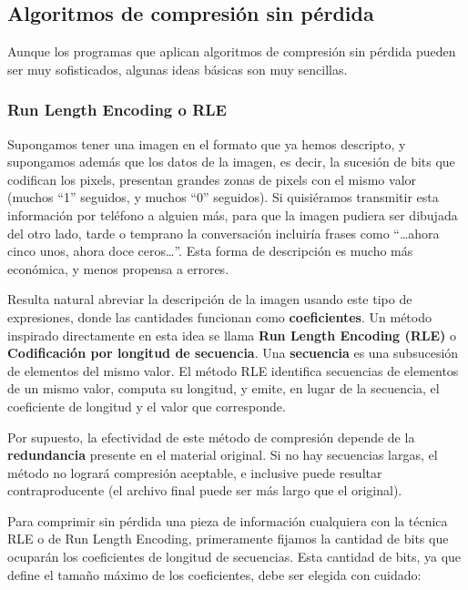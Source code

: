 \documentclass[spanish,A4,]{article}
\begin{document}
\subsection{Algoritmos de compresión sin
pérdida}\label{algoritmos-de-compresiuxf3n-sin-puxe9rdida}

Aunque los programas que aplican algoritmos de compresión sin pérdida
pueden ser muy sofisticados, algunas ideas básicas son muy sencillas.

\subsubsection{Run Length Encoding o
RLE}\label{run-length-encoding-o-rle}

Supongamos tener una imagen en el formato que ya hemos descripto, y
supongamos además que los datos de la imagen, es decir, la sucesión de
bits que codifican los pixels, presentan grandes zonas de pixels con el
mismo valor (muchos ``1'' seguidos, y muchos ``0'' seguidos). Si
quisiéramos transmitir esta información por teléfono a alguien más, para
que la imagen pudiera ser dibujada del otro lado, tarde o temprano la
conversación incluiría frases como ``\ldots{}ahora cinco unos, ahora
doce ceros\ldots{}''. Esta forma de descripción es mucho más económica,
y menos propensa a errores.

Resulta natural abreviar la descripción de la imagen usando este tipo de
expresiones, donde las cantidades funcionan como \textbf{coeficientes}.
Un método inspirado directamente en esta idea se llama \textbf{Run
Length Encoding (RLE)} o \textbf{Codificación por longitud de
secuencia}. Una \textbf{secuencia} es una subsucesión de elementos del
mismo valor. El método RLE identifica secuencias de elementos de un
mismo valor, computa su longitud, y emite, en lugar de la secuencia, el
coeficiente de longitud y el valor que corresponde.

Por supuesto, la efectividad de este método de compresión depende de la
\textbf{redundancia} presente en el material original. Si no hay
secuencias largas, el método no logrará compresión aceptable, e
inclusive puede resultar contraproducente (el archivo final puede ser
más largo que el original).

Para comprimir sin pérdida una pieza de información cualquiera con la
técnica RLE o de Run Length Encoding, primeramente fijamos la cantidad
de bits que ocuparán los coeficientes de longitud de secuencias. Esta
cantidad de bits, ya que define el tamaño máximo de los coeficientes,
debe ser elegida con cuidado:
\end{document}
